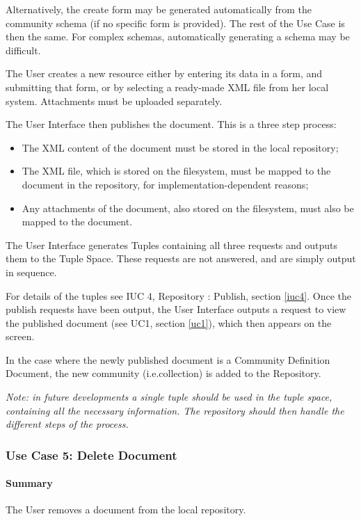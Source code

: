 \documentclass[titlepage]{article}%
\begin{document}
Alternatively, the create form may be generated automatically from the community schema (if no specific form is provided). The rest of the Use Case is then the same. For complex schemas, automatically generating a schema may be difficult.

The User creates a new resource either by entering its data in a form, and submitting that form, or by selecting a ready-made XML file from her local system. Attachments must be uploaded separately.

The User Interface then publishes the document. This is a three step process:
\begin{itemize}
\item The XML content of the document must be stored in the local repository;
\item The XML file, which is stored on the filesystem, must be mapped to the document in the repository, for implementation-dependent reasons;
\item Any attachments of the document, also stored on the filesystem, must also be mapped to the document.
\end{itemize}

The User Interface generates Tuples containing all three requests and outputs them to the Tuple Space. These requests are not answered, and are simply output in sequence.

For details of the tuples see IUC 4, Repository : Publish, section \ref{iuc4}.
Once the publish requests have been output, the User Interface outputs a request to view the published document (see UC1, section \ref{uc1}), which then appears on the screen.

In the case where the newly published document is a Community Definition Document, the new community (i.e.collection) is added to the Repository.

\emph{Note: in future developments a single tuple should be used in the tuple space, containing all the necessary information. The repository should then handle the different steps of the process.}
\subsubsection{Use Case 5: Delete Document} 
\label{uc5}

\paragraph{Summary}
The User removes a document from the local repository.
\end{document}
